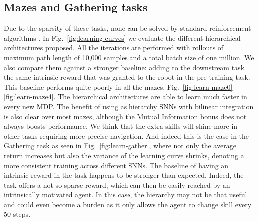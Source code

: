 \documentclass{article} %
\begin{document}
\subsection{Mazes and Gathering tasks}
Due to the sparsity of these tasks, none can be solved by standard reinforcement algorithms \citep{duan2016benchmarking}. In Fig.\ \ref{fig:learning-curves} we evaluate the different hierarchical architectures proposed. All the iterations are performed with rollouts of maximum path length of 10,000 samples and a total batch size of one million. We also compare them against a stronger baseline: adding to the downstream task the same intrinsic reward that was granted to the robot in the pre-training task. This baseline performs quite poorly in all the mazes, Fig.\ \ref{fig:learn-maze0}-\ref{fig:learn-maze4}. The hierarchical architectures are able to learn much faster in every new MDP. The benefit of using as hierarchy SNNs with bilinear integration is also clear over most mazes, although the Mutual Information bonus does not always boosts performance. We think that the extra skills will shine more in other tasks requiring more precise navigation. And indeed this is the case in the Gathering task as seen in Fig.\ \ref{fig:learn-gather}, where not only the average return increases but also the variance of the learning curve shrinks, denoting a more consistent training across different SNNs. The baseline of having an intrinsic reward in the task happens to be stronger than expected. Indeed, the task offers a not-so sparse reward, which can then be easily reached by an intrinsically motivated agent. In this case, the hierarchy may not be that useful and could even become a burden as it only allows the agent to change skill every 50 steps.
\end{document}

